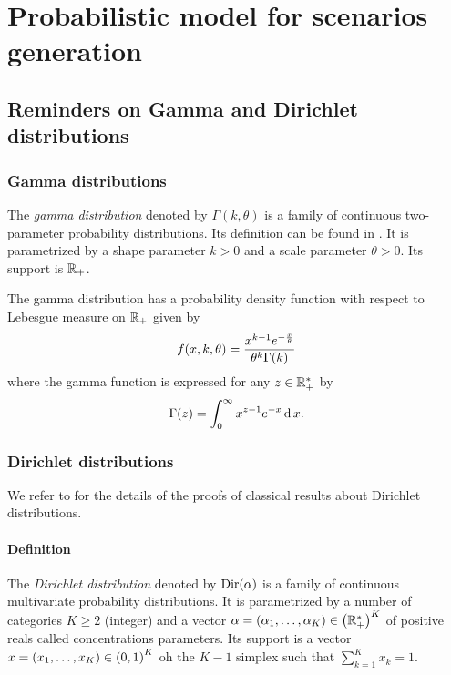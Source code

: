 \chapter{Probabilistic model for scenarios generation}
\label{chap:appendix:probabilistic-model}



\section{Reminders on Gamma and Dirichlet distributions}
\label{sec:reminders:gamma-and-dirichlet-distributions}



\subsection{Gamma distributions}

The \emph{gamma distribution} denoted by $\Gamma(k,\theta)$ is a family of continuous two-parameter probability distributions.
Its definition can be found in \citet[Appendix A]{Delmas2006}.
It is parametrized by a shape parameter $k>0$ and a scale parameter $\theta>0$.
Its support is $\mathbb{R}_+$.

The gamma distribution has a probability density function with respect to Lebesgue measure on $\mathbb{R}_+$ given by
\begin{equation}\label{eq:dirchlet:probability-density-function}
  f\bracket{x,k,\theta} = \frac{x^{k-1}e^{-\frac{x}{\theta}}}{ \theta^k\Gamma\bracket{k} }
\end{equation}
where the gamma function is expressed for any $z\in\mathbb{R}_+^*$ by
\begin{equation}
  \Gamma\bracket{z} = \int_0^{\infty} x^{z-1}e^{-x} \diff x.
\end{equation}


\subsection{Dirichlet distributions}

We refer to \citet[Chapter 49]{Kotz2000} for the details of the proofs of classical results about Dirichlet distributions.


\subsubsection{Definition}


The \emph{Dirichlet distribution} denoted by $\operatorname{Dir}(\alpha)$ is a family of continuous multivariate probability distributions.
It is parametrized by a number of categories $K \ge 2$ (integer) and a vector $\alpha=\bracket{\alpha_1,\ldots,\alpha_K}\in\bracket{\RR_+^*}^K$ of positive reals called concentrations parameters.
Its support is a vector $x=\bracket{x_1,\ldots,x_K}\in\bracket{0,1}^K$ oh the $K-1$ simplex \ie such that $\sum_{k=1}^K x_k = 1$.

